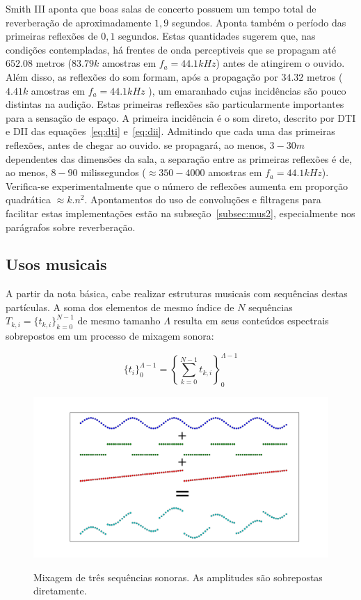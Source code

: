 Smith III aponta que boas salas de concerto possuem um tempo total de reverberação de aproximadamente $1,9$ segundos. Aponta também o período das primeiras reflexões de $0,1$ segundos. Estas quantidades sugerem que, nas condições contempladas, há frentes de onda perceptiveis que se propagam até $652.08$ metros ($83.79k$ amostras em $f_a=44.1kHz$) antes de atingirem o ouvido. Além disso, as reflexões do som formam, após a propagação por $34.32$ metros ($4.41k$ amostras em $f_a=44.1kHz$ ), um emaranhado cujas incidências são pouco distintas na audição. Estas primeiras reflexões são particularmente importantes para a sensação de espaço. A primeira incidência é o som direto, descrito por DTI e DII das equações~\ref{eq:dti} e~\ref{eq:dii}. Admitindo que cada uma das primeiras reflexões, antes de chegar ao ouvido. se propagará, ao menos, $3-30m$ dependentes das dimensões da sala, a separação entre as primeiras reflexões é de, ao menos, $8-90$ milissegundos ($\approx 350-4000$ amostras em $f_a=44.1kHz$). Verifica-se experimentalmente que o número de reflexões aumenta em proporção quadrática  $ \approx k.n^2$. Apontamentos do uso de convoluções e filtragens para facilitar estas implementações estão na subseção~\ref{subsec:mus2}, especialmente nos parágrafos sobre reverberação.

\subsection{Usos musicais}\label{subsec:basMus}


A partir da nota básica, cabe realizar estruturas musicais com
sequências destas partículas. A soma dos elementos de mesmo índice de $N$ sequências $T_{k,i}=\{t_{k,i}\}_{k=0}^{N-1}$ de mesmo tamanho $\Lambda$ resulta em seus conteúdos espectrais sobrepostos em um processo de mixagem sonora:

\begin{equation}\label{eq:mixagem}
\{t_i\}_0^{\Lambda-1}=\left \{ \sum_{k=0}^{N-1}t_{k,i} \right \}_0^{\Lambda-1}
\end{equation}

\begin{figure}[h!]
    {\centering
        \includegraphics[width=\textwidth]{figuras/mixagem}}
    \caption{Mixagem de três sequências sonoras. As amplitudes são sobrepostas diretamente.}

        \label{fig:mixagem}
\end{figure}


